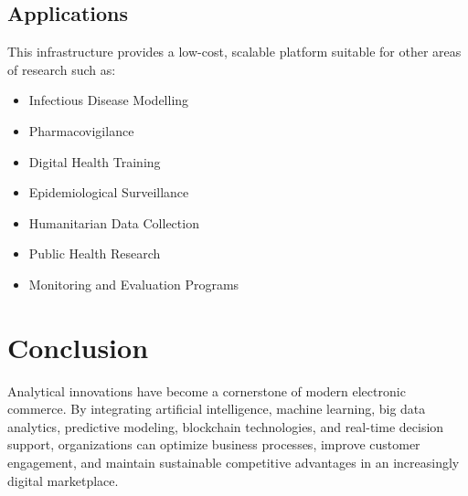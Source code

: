 \documentclass[12pt]{article}
\begin{document}
\subsection{Applications}

This infrastructure provides a low-cost, scalable platform suitable for other areas of research such as:

\begin{itemize}
    \item Infectious Disease Modelling
    \item Pharmacovigilance
    \item Digital Health Training
    \item Epidemiological Surveillance
    \item Humanitarian Data Collection
    \item Public Health Research
    \item Monitoring and Evaluation Programs
\end{itemize}
\section{Conclusion}

Analytical innovations have become a cornerstone of modern electronic commerce. By integrating artificial intelligence, machine learning, big data analytics, predictive modeling, blockchain technologies, and real-time decision support, organizations can optimize business processes, improve customer engagement, and maintain sustainable competitive advantages in an increasingly digital marketplace.
\end{document}
